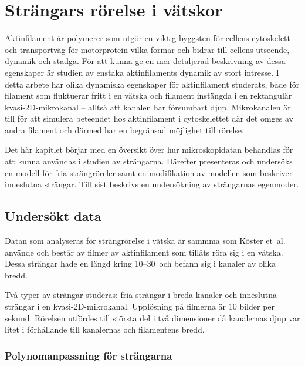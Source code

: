 \chapter{Strängars rörelse i vätskor}

Aktinfilament är polymerer som utgör en viktig byggsten för cellens cytoskelett och transportväg för motorprotein vilka formar och bidrar till cellens utseende, dynamik och stadga. För att kunna ge en mer detaljerad beskrivning av dessa egenskaper är studien av enstaka aktinfilaments dynamik av stort intresse. I detta arbete har olika dynamiska egenskaper för aktinfilament studerats, både för filament som fluktuerar fritt i en vätska och filament instängda i en rektangulär kvasi-2D-mikrokanal -- alltså att kanalen har försumbart djup. Mikrokanalen är till för att simulera beteendet hos aktinfilament i cytoskelettet där det omges av andra filament och därmed har en begränsad möjlighet till rörelse.

Det här kapitlet börjar med en översikt över hur mikroskopidatan behandlas för att kunna användas i studien av strängarna. Därefter presenteras och undersöks en modell för fria strängröreler samt en modifikation av modellen som beskriver inneslutna strängar. Till sist beskrivs en undersökning av strängarnas egenmoder.

\section{Undersökt data}
Datan som analyseras för strängrörelse i vätska är sammma som Köster et~al.~\cite{Koster_etal2005,Koster_etal2007} använde och består av filmer av aktinfilament som tillåts röra sig i en vätska. Dessa strängar hade en längd kring 10--30\, och befann sig i kanaler av olika bredd. %

Två typer av strängar studeras: fria strängar i breda kanaler och inneslutna strängar i en kvasi-2D-mikrokanal. Upplösning på filmerna är 10 bilder per sekund. Rörelsen utfördes till största del i två dimensioner då kanalernas djup var litet i förhållande till kanalernas och filamentens bredd.


\subsection{Polynomanpassning för strängarna} \label{sec:polynomanpassning}

